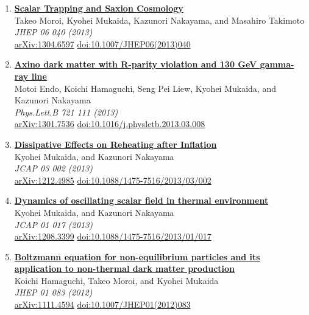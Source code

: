 \begin{enumerate}
\item \textbf{\href{https://arxiv.org/abs/1304.6597}{Scalar Trapping and Saxion Cosmology}}\\
Takeo Moroi, Kyohei Mukaida, Kazunori Nakayama, and Masahiro Takimoto\\
\emph{JHEP 06 040 (2013)}
\\ \href{https://arxiv.org/abs/1304.6597}{arXiv:1304.6597} \href{https://doi.org/10.1007/JHEP06(2013)040}{doi:10.1007/JHEP06(2013)040}

\item \textbf{\href{https://arxiv.org/abs/1301.7536}{Axino dark matter with R-parity violation and 130 GeV gamma-ray line}}\\
Motoi Endo, Koichi Hamaguchi, Seng Pei Liew, Kyohei Mukaida, and Kazunori Nakayama\\
\emph{Phys.Lett.B 721 111 (2013)}
\\ \href{https://arxiv.org/abs/1301.7536}{arXiv:1301.7536} \href{https://doi.org/10.1016/j.physletb.2013.03.008}{doi:10.1016/j.physletb.2013.03.008}

\item \textbf{\href{https://arxiv.org/abs/1212.4985}{Dissipative Effects on Reheating after Inflation}}\\
Kyohei Mukaida, and Kazunori Nakayama\\
\emph{JCAP 03 002 (2013)}
\\ \href{https://arxiv.org/abs/1212.4985}{arXiv:1212.4985} \href{https://doi.org/10.1088/1475-7516/2013/03/002}{doi:10.1088/1475-7516/2013/03/002}

\item \textbf{\href{https://arxiv.org/abs/1208.3399}{Dynamics of oscillating scalar field in thermal environment}}\\
Kyohei Mukaida, and Kazunori Nakayama\\
\emph{JCAP 01 017 (2013)}
\\ \href{https://arxiv.org/abs/1208.3399}{arXiv:1208.3399} \href{https://doi.org/10.1088/1475-7516/2013/01/017}{doi:10.1088/1475-7516/2013/01/017}

\item \textbf{\href{https://arxiv.org/abs/1111.4594}{Boltzmann equation for non-equilibrium particles and its application to non-thermal dark matter production}}\\
Koichi Hamaguchi, Takeo Moroi, and Kyohei Mukaida\\
\emph{JHEP 01 083 (2012)}
\\ \href{https://arxiv.org/abs/1111.4594}{arXiv:1111.4594} \href{https://doi.org/10.1007/JHEP01(2012)083}{doi:10.1007/JHEP01(2012)083}
\end{enumerate}
